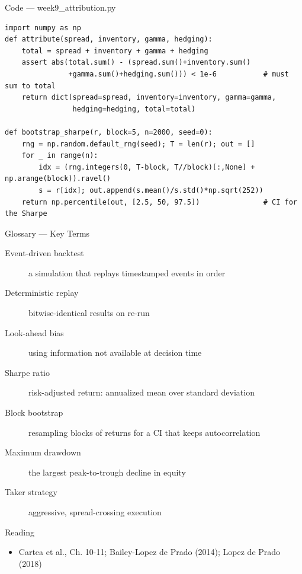 \documentclass[aspectratio=169,10pt]{beamer}
\begin{document}
\begin{frame}[fragile]{Code --- week9\_attribution.py}
\begin{lstlisting}
import numpy as np
def attribute(spread, inventory, gamma, hedging):
    total = spread + inventory + gamma + hedging
    assert abs(total.sum() - (spread.sum()+inventory.sum()
               +gamma.sum()+hedging.sum())) < 1e-6           # must sum to total
    return dict(spread=spread, inventory=inventory, gamma=gamma,
                hedging=hedging, total=total)

def bootstrap_sharpe(r, block=5, n=2000, seed=0):
    rng = np.random.default_rng(seed); T = len(r); out = []
    for _ in range(n):
        idx = (rng.integers(0, T-block, T//block)[:,None] + np.arange(block)).ravel()
        s = r[idx]; out.append(s.mean()/s.std()*np.sqrt(252))
    return np.percentile(out, [2.5, 50, 97.5])               # CI for the Sharpe
\end{lstlisting}
\end{frame}
\begin{frame}{Glossary --- Key Terms}
\footnotesize\begin{description}
\item[\color{ncsured}Event-driven backtest] a simulation that replays timestamped events in order
\item[\color{ncsured}Deterministic replay] bitwise-identical results on re-run
\item[\color{ncsured}Look-ahead bias] using information not available at decision time
\item[\color{ncsured}Sharpe ratio] risk-adjusted return: annualized mean over standard deviation
\item[\color{ncsured}Block bootstrap] resampling blocks of returns for a CI that keeps autocorrelation
\item[\color{ncsured}Maximum drawdown] the largest peak-to-trough decline in equity
\item[\color{ncsured}Taker strategy] aggressive, spread-crossing execution
\end{description}
\end{frame}

\begin{frame}{Reading}
\begin{itemize}
  \item Cartea et al., Ch. 10-11; Bailey-Lopez de Prado (2014); Lopez de Prado (2018)
\end{itemize}
\end{frame}
\end{document}
